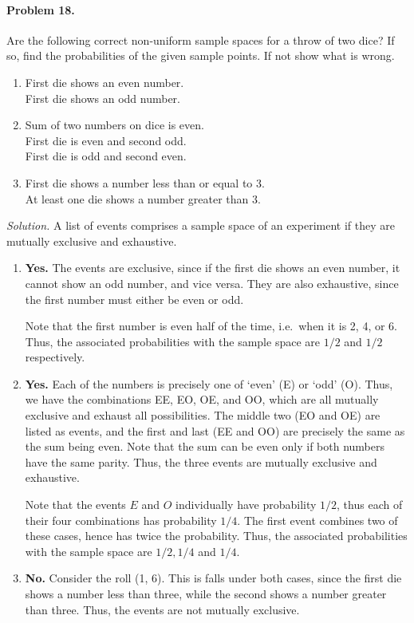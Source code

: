 \documentclass[10pt]{article}
\begin{document}
        \paragraph{Problem 18.} Are the following correct non-uniform sample spaces for a throw of two dice?
        If so, find the probabilities of the given sample points. If not show what is wrong.
        \begin{enumerate}
                \item First die shows an even number. \\ First die shows an odd number.
                \item Sum of two numbers on dice is even. \\ First die is even and second odd. \\ First die is odd and second even.
                \item First die shows a number less than or equal to 3. \\ At least one die shows a number greater than 3.
        \end{enumerate}

        \textit{Solution.} A list of events comprises a sample space of an experiment if they are mutually exclusive and exhaustive.
        \begin{enumerate}
                \item \textbf{Yes.} The events are exclusive, since if the first die shows an even number, it cannot show an odd number,
                and vice versa. They are also exhaustive, since the first number must either be even or odd.

                Note that the first number is even half of the time, i.e.\ when it is 2, 4, or 6. Thus, the associated probabilities 
                with the sample space are $1 /2$ and $1 /2$ respectively.

                \item \textbf{Yes.} Each of the numbers is precisely one of `even' (E) or `odd' (O). Thus, we have the combinations
                EE, EO, OE, and OO, which are all mutually exclusive and exhaust all possibilities. The middle two (EO and OE) are listed
                as events, and the first and last (EE and OO) are precisely the same as the sum being even. Note that the sum can be even
                only if both numbers have the same parity. Thus, the three events are mutually exclusive and exhaustive.

                Note that the events $E$ and $O$ individually have probability $1 /2$, thus each of their four combinations has probability
                $1 /4$. The first event combines two of these cases, hence has twice the probability. Thus, the associated probabilities 
                with the sample space are $1 /2, 1 /4$ and $1 /4$.

                \item \textbf{No.} Consider the roll (1, 6). This is falls under both cases, since the first die shows a number
                less than three, while the second shows a number greater than three. Thus, the events are not mutually exclusive. 
        \end{enumerate}
\end{document}
